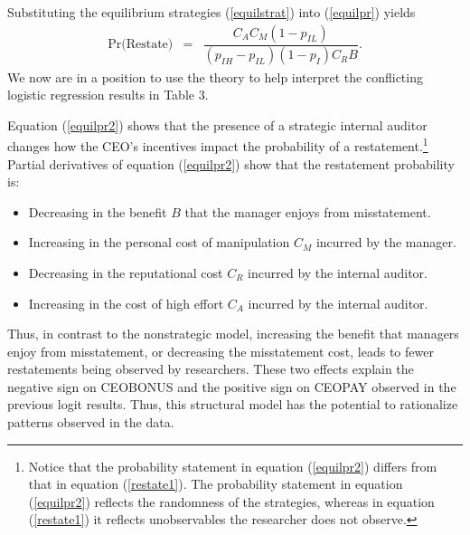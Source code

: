 Substituting the equilibrium strategies (\ref{equilstrat}) into (\ref{equilpr}) yields
\begin{equation} \label{equilpr2}
\begin{array}{lcl}
\mbox{Pr(Restate)}& = &  \dfrac{C_AC_M(1-p_{IL})}{(p_{IH}-p_{IL})(1-p_I)C_RB}.
\end{array}\end{equation}
We now are in a position to use the theory to help interpret the conflicting logistic regression results
in Table 3. 

 
Equation (\ref{equilpr2}) shows that the presence of a strategic internal auditor
changes how the CEO's incentives impact the probability of a restatement.\footnote{Notice that
the probability statement in equation  (\ref{equilpr2})  differs from that in equation (\ref{restate1}).
The probability statement in equation  (\ref{equilpr2}) reflects the randomness of the
strategies, whereas in equation (\ref{restate1}) it reflects unobservables the researcher 
does not observe.} Partial derivatives of equation (\ref{equilpr2}) show that the restatement probability is:\\

\begin{itemize}
\item Decreasing in the benefit $B$ that the manager enjoys from misstatement.
\item Increasing in the personal cost of manipulation $C_M$ incurred by the manager.
\item Decreasing in the reputational cost $C_R$ incurred by the internal auditor.
\item Increasing in the cost of high effort $C_A$ incurred by the internal auditor.\\
\end{itemize}

Thus, in contrast to the nonstrategic model, increasing the benefit that managers enjoy from misstatement,
or decreasing the misstatement cost, leads to fewer restatements being observed by researchers.
These two effects explain the negative sign on CEOBONUS and the positive sign on CEOPAY observed in the previous logit results. Thus, this structural model has the potential to rationalize patterns observed in the data.

